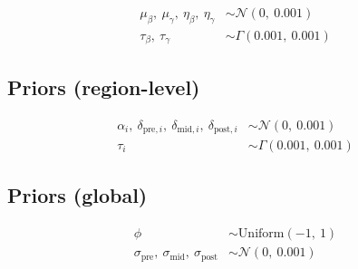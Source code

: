 \documentclass{article}
\begin{document}
\begin{align}
  \mu_\beta,\ \mu_\gamma,\ \eta_\beta,\ \eta_\gamma &\sim \mathcal{N}(0,\ 0.001) \\
  \tau_\beta,\ \tau_\gamma &\sim \Gamma(0.001,\ 0.001)
\end{align}

\subsection*{Priors (region-level)}

\begin{align}
  \alpha_i,\ \delta_{\text{pre},i},\ \delta_{\text{mid},i},\ \delta_{\text{post},i} &\sim \mathcal{N}(0,\ 0.001) \\
  \tau_i &\sim \Gamma(0.001,\ 0.001)
\end{align}

\subsection*{Priors (global)}

\begin{align}
  \phi &\sim \mathrm{Uniform}(-1,\ 1) \\
  \sigma_{\text{pre}},\ \sigma_{\text{mid}},\ \sigma_{\text{post}} &\sim \mathcal{N}(0,\ 0.001)
\end{align}
\end{document}
